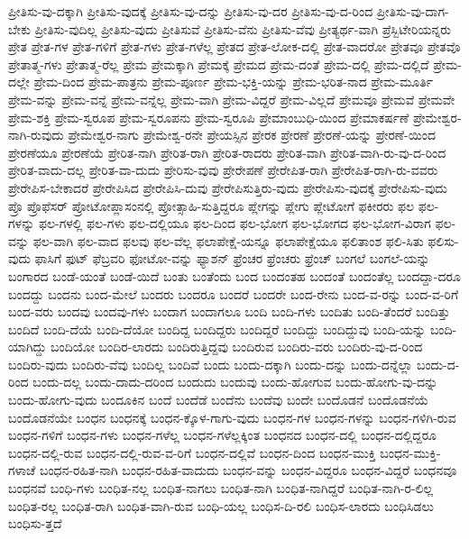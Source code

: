 {ಪ್ರೀತಿಸು-ವು-ದಕ್ಕಾಗಿ
ಪ್ರೀತಿಸು-ವುದಕ್ಕೆ
ಪ್ರೀತಿಸು-ವು-ದನ್ನು
ಪ್ರೀತಿಸು-ವು-ದರ
ಪ್ರೀತಿಸು-ವು-ದ-ರಿಂದ
ಪ್ರೀತಿಸು-ವು-ದಾಗ-ಬೇಕು
ಪ್ರೀತಿಸು-ವುದಿಲ್ಲ
ಪ್ರೀತಿಸು-ವುದು
ಪ್ರೀತಿಸುವೆ
ಪ್ರೀತಿಸು-ವೆನು
ಪ್ರೀತಿಸು-ವೆವು
ಪ್ರೀತ್ಯರ್ಥ-ವಾಗಿ
ಪ್ರೆಸ್ಬಿಟೇರಿಯನ್ನರು
ಪ್ರೇತ
ಪ್ರೇತ-ಗಳ
ಪ್ರೇತ-ಗಳಿಗೆ
ಪ್ರೇತ-ಗಳು
ಪ್ರೇತ-ಗಳೆಲ್ಲ
ಪ್ರೇತದ
ಪ್ರೇತ-ಲೋಕ-ದಲ್ಲಿ
ಪ್ರೇತ-ವಾದರೋ
ಪ್ರೇತವೂ
ಪ್ರೇತವೊ
ಪ್ರೇತಾತ್ಮ-ಗಳು
ಪ್ರೇತಾತ್ಮ-ರೆಲ್ಲ
ಪ್ರೇಮ
ಪ್ರೇಮಕ್ಕಾಗಿ
ಪ್ರೇಮಕ್ಕೆ
ಪ್ರೇಮದ
ಪ್ರೇಮ-ದಂತೆ
ಪ್ರೇಮ-ದಲ್ಲಿ
ಪ್ರೇಮ-ದಲ್ಲಿದೆ
ಪ್ರೇಮ-ದಲ್ಲೇ
ಪ್ರೇಮ-ದಿಂದ
ಪ್ರೇಮ-ಪಾತ್ರನು
ಪ್ರೇಮ-ಪೂರ್ಣ
ಪ್ರೇಮ-ಭಕ್ತಿ-ಯನ್ನು
ಪ್ರೇಮ-ಭರಿತ-ನಾದ
ಪ್ರೇಮ-ಮೂರ್ತಿ
ಪ್ರೇಮ-ವನ್ನು
ಪ್ರೇಮ-ವನ್ನೆ
ಪ್ರೇಮ-ವನ್ನೆಲ್ಲ
ಪ್ರೇಮ-ವಾಗಿ
ಪ್ರೇಮ-ವಿದ್ದರೆ
ಪ್ರೇಮ-ವಿಲ್ಲದೆ
ಪ್ರೇಮವೂ
ಪ್ರೇಮವೆ
ಪ್ರೇಮವೇ
ಪ್ರೇಮ-ಶಕ್ತಿ
ಪ್ರೇಮ-ಸ್ವರೂಪ
ಪ್ರೇಮ-ಸ್ವರೂಪನು
ಪ್ರೇಮ-ಸ್ವರೂಪಿ
ಪ್ರೇಮಾಂಬುಧಿ-ಯಿಂದ
ಪ್ರೇಮಾಕರ್ಷಣೆ
ಪ್ರೇಮೇಶ್ವರ-ನಾಗಿ-ರುವುದು
ಪ್ರೇಮೇಶ್ವರ-ನಾಗು
ಪ್ರೇಮೇಶ್ವ-ರನೇ
ಪ್ರೇಯಸ್ಸಿನ
ಪ್ರೇರಕ
ಪ್ರೇರಣೆ
ಪ್ರೇರಣೆ-ಯನ್ನು
ಪ್ರೇರಣೆ-ಯಿಂದ
ಪ್ರೇರಣೆಯೂ
ಪ್ರೇರಣೆಯೆ
ಪ್ರೇರಿತ-ನಾಗಿ
ಪ್ರೇರಿತ-ರಾಗಿ
ಪ್ರೇರಿತ-ರಾದರು
ಪ್ರೇರಿತ-ವಾಗಿ
ಪ್ರೇರಿತ-ವಾಗಿ-ರು-ವು-ದ-ರಿಂದ
ಪ್ರೇರಿತ-ವಾದು-ದಲ್ಲ
ಪ್ರೇರಿತ-ವಾ-ದುದು
ಪ್ರೇರಿಸು-ವುವು
ಪ್ರೇರೇಪಣೆ
ಪ್ರೇರೇಪಿತ-ರಾಗಿ
ಪ್ರೇರೇಪಿತ-ರಾಗಿ-ರು-ವವರು
ಪ್ರೇರೇಪಿಸ-ಬೇಕಾದರೆ
ಪ್ರೇರೇಪಿಸಿದ
ಪ್ರೇರೇಪಿಸಿ-ದುವು
ಪ್ರೇರೇಪಿಸುತ್ತಿರು-ವುದು
ಪ್ರೇರೇಪಿಸು-ವುದಕ್ಕೆ
ಪ್ರೇರೇಪಿಸು-ವುದು
ಪ್ರೊ
ಪ್ರೊಫೆಸರ್
ಪ್ರೋಟೋಪ್ಲಾಸಂನಲ್ಲಿ
ಪ್ರೋತ್ಸಾಹಿ-ಸುತ್ತಿದ್ದರೂ
ಪ್ಲೇಗನ್ನು
ಪ್ಲೇಗು
ಪ್ಲೇಟೋಗೆ
ಫಕೀರರು
ಫಲ
ಫಲ-ಗಳನ್ನು
ಫಲ-ಗಳಲ್ಲಿ
ಫಲ-ಗಳು
ಫಲ-ದಲ್ಲಿಯೂ
ಫಲ-ದಿಂದ
ಫಲ-ಭೋಗ
ಫಲ-ಭೋಗದ
ಫಲ-ಭೋಗ-ವಿರಾಗ
ಫಲ-ವನ್ನು
ಫಲ-ವಾಗಿ
ಫಲ-ವಾದ
ಫಲವು
ಫಲ-ವೆಲ್ಲ
ಫಲಾಪೇಕ್ಷೆ-ಯನ್ನೂ
ಫಲಾಪೇಕ್ಷೆಯೂ
ಫಲಿತಾಂಶ
ಫಲಿ-ಸಿತು
ಫಲಿಸು-ವುದು
ಫಾಸಿಗೆ
ಫುಟ್
ಫೆಬ್ರವರಿ
ಫೋಟೋ-ವನ್ನು
ಫ್ಯಾಶನ್
ಫ್ರೆಂಚರ
ಫ್ರೆಂಚರು
ಫ್ರೆಂಚ್
ಬಂಗಲೆ
ಬಂಗಲೆ-ಯನ್ನು
ಬಂಗಾರದ
ಬಂಡೆ-ಯಂತೆ
ಬಂಡೆ-ಯಿದೆ
ಬಂತು
ಬಂತೆಂದು
ಬಂದ
ಬಂದಂತಹ
ಬಂದಂತೆ
ಬಂದಂತೆಲ್ಲ
ಬಂದದ್ದಾ-ದರೂ
ಬಂದದ್ದು
ಬಂದನು
ಬಂದ-ಮೇಲೆ
ಬಂದರು
ಬಂದರೂ
ಬಂದರೆ
ಬಂದರೇ
ಬಂದ-ರೇನು
ಬಂದ-ವ-ರನ್ನು
ಬಂದ-ವ-ರಿಗೆ
ಬಂದ-ವರು
ಬಂದವು
ಬಂದವು-ಗಳು
ಬಂದಾಗ
ಬಂದಾಗಲೂ
ಬಂದಿ
ಬಂದಿ-ಗಳು
ಬಂದಿತು
ಬಂದಿ-ತೆಂದರೆ
ಬಂದಿತ್ತು
ಬಂದಿದೆ
ಬಂದಿ-ದೆಯೆ
ಬಂದಿ-ದೆಯೋ
ಬಂದಿದ್ದ
ಬಂದಿದ್ದರು
ಬಂದಿದ್ದರೆ
ಬಂದಿದ್ದು
ಬಂದಿದ್ದುವು
ಬಂದಿ-ಯನ್ನು
ಬಂದಿ-ಯಾಗಿದ್ದು
ಬಂದಿಯೋ
ಬಂದಿರ-ಲಾರದು
ಬಂದಿರುತ್ತಿದ್ದವು
ಬಂದಿರುವ
ಬಂದಿರು-ವರು
ಬಂದಿರು-ವು-ದ-ರಿಂದ
ಬಂದಿರು-ವುದು
ಬಂದಿರು-ವೆವು
ಬಂದಿಲ್ಲ
ಬಂದಿವೆ
ಬಂದು
ಬಂದು-ದಕ್ಕಾಗಿ
ಬಂದು-ದನ್ನು
ಬಂದು-ದನ್ನೆಲ್ಲಾ
ಬಂದು-ದ-ರಿಂದ
ಬಂದು-ದಲ್ಲ
ಬಂದು-ದಾದು-ದರಿಂದ
ಬಂದುದು
ಬಂದುವು
ಬಂದು-ಹೋಗುವ
ಬಂದು-ಹೋಗು-ವು-ದನ್ನು
ಬಂದು-ಹೋಗು-ವುದು
ಬಂದೂಕಿನ
ಬಂದೆ
ಬಂದೆಡೆ
ಬಂದೆನು
ಬಂದೆವು
ಬಂದೇ
ಬಂದೊಡನೆ
ಬಂದೊಡನೆಯೆ
ಬಂದೊಡನೆಯೇ
ಬಂಧನ
ಬಂಧನಕ್ಕೆ
ಬಂಧನ-ಕ್ಕೊಳ-ಗಾಗು-ವುದು
ಬಂಧನ-ಗಳ
ಬಂಧನ-ಗಳನ್ನು
ಬಂಧನ-ಗಳಿಗಿ-ರುವ
ಬಂಧನ-ಗಳಿಗೆ
ಬಂಧನ-ಗಳು
ಬಂಧನ-ಗಳೆಲ್ಲ
ಬಂಧನ-ಗಳೆಲ್ಲಕ್ಕಿಂತ
ಬಂಧನದ
ಬಂಧನ-ದಲ್ಲಿ
ಬಂಧನ-ದಲ್ಲಿದ್ದರೂ
ಬಂಧನ-ದಲ್ಲಿ-ರುವ
ಬಂಧನ-ದಲ್ಲಿ-ರುವ-ವ-ರಿಗೆ
ಬಂಧನ-ದಲ್ಲಿವೆ
ಬಂಧನ-ದಿಂದ
ಬಂಧನ-ಮುಕ್ತಿ
ಬಂಧನ-ಮುಕ್ತಿ-ಗಳಾಚೆ
ಬಂಧನ-ರಹಿತ-ನಾಗಿ
ಬಂಧನ-ರಹಿತ-ವಾದುದು
ಬಂಧನ-ವನ್ನು
ಬಂಧನ-ವಿದ್ದರೂ
ಬಂಧನ-ವಿದ್ದರೆ
ಬಂಧನವೂ
ಬಂಧನವೆ
ಬಂಧಿ-ಗಳು
ಬಂಧಿತ-ನಲ್ಲ
ಬಂಧಿತ-ನಾಗಲು
ಬಂಧಿತ-ನಾಗಿ
ಬಂಧಿತ-ನಾಗಿದ್ದರೆ
ಬಂಧಿತ-ನಾಗಿ-ರ-ಲಿಲ್ಲ
ಬಂಧಿತ-ರಲ್ಲ
ಬಂಧಿತ-ರಾಗಿ
ಬಂಧಿತ-ವಾಗಿ-ರುವ
ಬಂಧಿ-ಯಲ್ಲ
ಬಂಧಿಸ-ದಿ-ರಲಿ
ಬಂಧಿಸ-ಲಾರದು
ಬಂಧಿಸಿಡಲು
ಬಂಧಿಸು-ತ್ತದೆ
}
